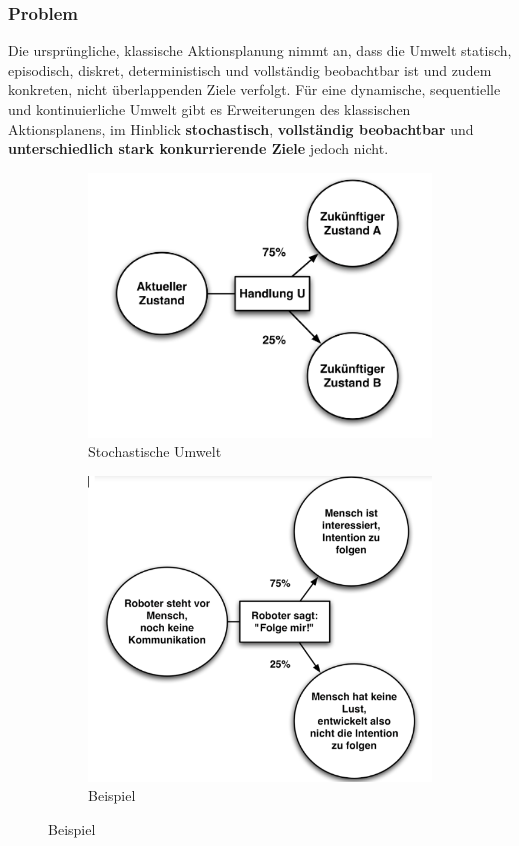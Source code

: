 \subsubsection{Problem}
Die urspr\"ungliche, klassische Aktionsplanung nimmt an, dass die Umwelt statisch, episodisch, diskret, deterministisch und vollst\"andig beobachtbar ist und zudem konkreten, nicht \"uberlappenden Ziele verfolgt. 
F\"ur eine dynamische, sequentielle und kontinuierliche Umwelt gibt es Erweiterungen des klassischen Aktionsplanens, im Hinblick \textbf{stochastisch}, \textbf{vollst\"andig beobachtbar} und \textbf{unterschiedlich stark konkurrierende Ziele} jedoch nicht.
%
\begin{figure}[ht]
	\centering 
	\begin{subfigure}{.45\textwidth}
		\includegraphics[width=\textwidth]{figures/ch07_stochastischeUmwelt.png}
		\caption{Stochastische Umwelt}
		\label{ch07_stumwelt}
	\end{subfigure}
	\begin{subfigure}{.4\textwidth}
		\includegraphics[width=\textwidth]{figures/ch07_umwelt-bsp.png}
		\caption{Beispiel}
		\label{ch07_umwelt-bsp}
	\end{subfigure}
\end{figure}

